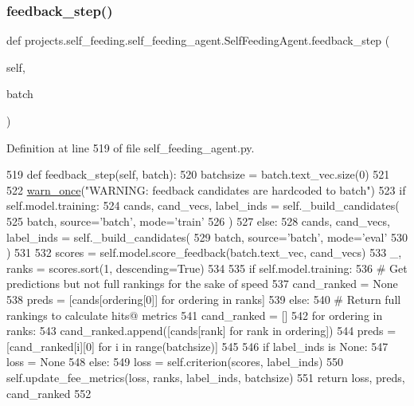 \subsubsection{\texorpdfstring{feedback\+\_\+step()}{feedback\_step()}}
{\footnotesize\ttfamily def projects.\+self\+\_\+feeding.\+self\+\_\+feeding\+\_\+agent.\+Self\+Feeding\+Agent.\+feedback\+\_\+step (\begin{DoxyParamCaption}\item[{}]{self,  }\item[{}]{batch }\end{DoxyParamCaption})}



Definition at line 519 of file self\+\_\+feeding\+\_\+agent.\+py.


\begin{DoxyCode}
519     \textcolor{keyword}{def }feedback\_step(self, batch):
520         batchsize = batch.text\_vec.size(0)
521 
522         \hyperlink{namespaceparlai_1_1utils_1_1misc_a884a3aefa90581f53bc592fa6a78dc43}{warn\_once}(\textcolor{stringliteral}{"WARNING: feedback candidates are hardcoded to batch"})
523         \textcolor{keywordflow}{if} self.model.training:
524             cands, cand\_vecs, label\_inds = self.\_build\_candidates(
525                 batch, source=\textcolor{stringliteral}{'batch'}, mode=\textcolor{stringliteral}{'train'}
526             )
527         \textcolor{keywordflow}{else}:
528             cands, cand\_vecs, label\_inds = self.\_build\_candidates(
529                 batch, source=\textcolor{stringliteral}{'batch'}, mode=\textcolor{stringliteral}{'eval'}
530             )
531 
532         scores = self.model.score\_feedback(batch.text\_vec, cand\_vecs)
533         \_, ranks = scores.sort(1, descending=\textcolor{keyword}{True})
534 
535         \textcolor{keywordflow}{if} self.model.training:
536             \textcolor{comment}{# Get predictions but not full rankings for the sake of speed}
537             cand\_ranked = \textcolor{keywordtype}{None}
538             preds = [cands[ordering[0]] \textcolor{keywordflow}{for} ordering \textcolor{keywordflow}{in} ranks]
539         \textcolor{keywordflow}{else}:
540             \textcolor{comment}{# Return full rankings to calculate hits@ metrics}
541             cand\_ranked = []
542             \textcolor{keywordflow}{for} ordering \textcolor{keywordflow}{in} ranks:
543                 cand\_ranked.append([cands[rank] \textcolor{keywordflow}{for} rank \textcolor{keywordflow}{in} ordering])
544             preds = [cand\_ranked[i][0] \textcolor{keywordflow}{for} i \textcolor{keywordflow}{in} range(batchsize)]
545 
546         \textcolor{keywordflow}{if} label\_inds \textcolor{keywordflow}{is} \textcolor{keywordtype}{None}:
547             loss = \textcolor{keywordtype}{None}
548         \textcolor{keywordflow}{else}:
549             loss = self.criterion(scores, label\_inds)
550             self.update\_fee\_metrics(loss, ranks, label\_inds, batchsize)
551         \textcolor{keywordflow}{return} loss, preds, cand\_ranked
552 
\end{DoxyCode}
